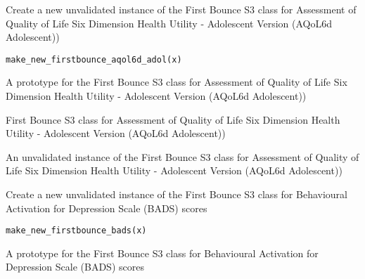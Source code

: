 \documentclass[a4paper]{book}
\begin{document}
%
\begin{Description}\relax
Create a new unvalidated instance of the First Bounce S3 class for Assessment of Quality of Life Six Dimension Health Utility - Adolescent Version (AQoL6d Adolescent))
\end{Description}
%
\begin{Usage}
\begin{verbatim}
make_new_firstbounce_aqol6d_adol(x)
\end{verbatim}
\end{Usage}
%
\begin{Arguments}
\begin{ldescription}
\item[\code{x}] A prototype for the First Bounce S3 class for Assessment of Quality of Life Six Dimension Health Utility - Adolescent Version (AQoL6d Adolescent))
\end{ldescription}
\end{Arguments}
%
\begin{Details}\relax
First Bounce S3 class for Assessment of Quality of Life Six Dimension Health Utility - Adolescent Version (AQoL6d Adolescent))
\end{Details}
%
\begin{Value}
An unvalidated instance of the First Bounce S3 class for Assessment of Quality of Life Six Dimension Health Utility - Adolescent Version (AQoL6d Adolescent))
\end{Value}
%
\begin{Description}\relax
Create a new unvalidated instance of the First Bounce S3 class for Behavioural Activation for Depression Scale (BADS) scores
\end{Description}
%
\begin{Usage}
\begin{verbatim}
make_new_firstbounce_bads(x)
\end{verbatim}
\end{Usage}
%
\begin{Arguments}
\begin{ldescription}
\item[\code{x}] A prototype for the First Bounce S3 class for Behavioural Activation for Depression Scale (BADS) scores
\end{ldescription}
\end{Arguments}
\end{document}
